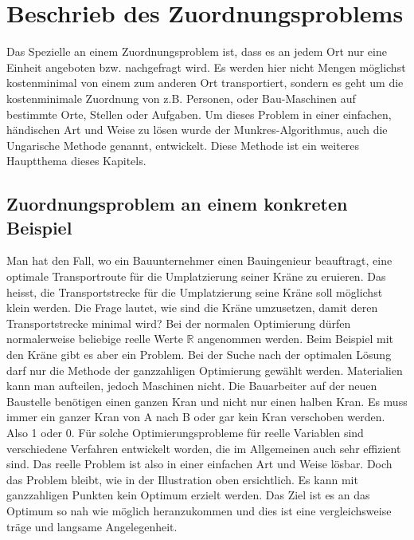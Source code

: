 %
%
%
\section{Beschrieb des Zuordnungsproblems
\label{munkres:section:teil1}}

Das Spezielle an einem Zuordnungsproblem ist, dass es an jedem Ort nur eine Einheit angeboten bzw. nachgefragt wird. Es werden hier nicht Mengen möglichst kostenminimal von einem zum anderen
Ort transportiert, sondern es geht um die kostenminimale Zuordnung von z.B. Personen, oder Bau-Maschinen auf bestimmte Orte, Stellen oder Aufgaben.
Um dieses Problem in einer einfachen, händischen Art und Weise zu lösen wurde der Munkres-Algorithmus, auch die Ungarische Methode genannt, entwickelt. Diese Methode ist ein weiteres Hauptthema dieses Kapitels.

\subsection{Zuordnungsproblem an einem konkreten Beispiel
\label{munkres:subsection:bonorum}}
Man hat den Fall, wo ein Bauunternehmer einen Bauingenieur beauftragt, eine optimale Transportroute für die Umplatzierung seiner Kräne zu eruieren. Das heisst, die Transportstrecke für die Umplatzierung seine Kräne
soll möglichst klein werden. 
Die Frage lautet, wie sind die Kräne umzusetzen, damit deren Transportstrecke minimal wird? Bei der normalen Optimierung dürfen normalerweise beliebige reelle Werte $\mathbb{R}$ angenommen werden. 
Beim Beispiel mit den Kräne gibt es aber ein Problem. Bei der Suche nach der optimalen Lösung darf  nur die Methode der ganzzahligen Optimierung gewählt werden. Materialien kann man aufteilen, jedoch Maschinen nicht. Die Bauarbeiter auf der neuen Baustelle benötigen einen ganzen Kran und nicht nur einen halben Kran. Es muss immer ein ganzer Kran von A nach B oder gar kein Kran verschoben werden. Also 1 oder 0.
Für solche Optimierungsprobleme für reelle Variablen sind verschiedene Verfahren entwickelt worden, die im Allgemeinen auch sehr effizient sind. Das reelle Problem ist also in einer einfachen Art und Weise lösbar. Doch das Problem bleibt, wie in der Illustration oben ersichtlich. Es kann mit ganzzahligen Punkten kein Optimum erzielt werden. Das Ziel ist es an das Optimum so nah wie möglich heranzukommen und dies ist eine vergleichsweise träge und langsame Angelegenheit.

